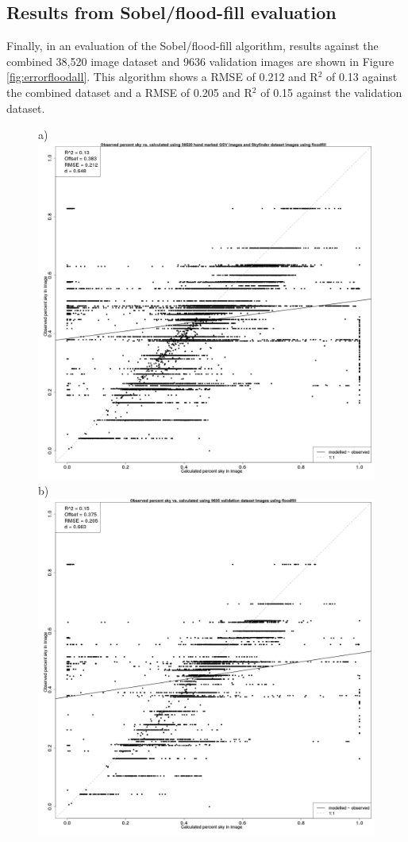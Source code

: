 \documentclass[final,3p,times,authoryear]{elsarticle}
\begin{document}
\subsection{Results from Sobel/flood-fill evaluation}\label{sec:resultsflood}
Finally, in an evaluation of the Sobel/flood-fill algorithm, results against the combined 38,520 image dataset and 9636 validation images are shown in Figure \ref{fig:errorfloodall}. This algorithm shows a RMSE of 0.212 and R$^{2}$ of 0.13 against the combined dataset and a RMSE of 0.205 and R$^{2}$ of 0.15 against the validation dataset.


\begin{figure}
\centering
a)\includegraphics[scale=0.12]{Images/ErrorPlots2FloodfillAll.png}
b)\includegraphics[scale=0.12]{Images/ErrorPlots2FloodfillValidation.png}

\end{figure}
\end{document}
